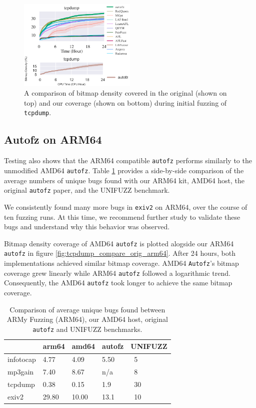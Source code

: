\begin{figure}[ht!]
    \includegraphics[width=0.5\textwidth]{figs/tcpdump_compare_orig_amd64.png}
    \centering
    \caption{A comparison of bitmap density covered in the original\cite{fu_autofz_2023} (shown 
    on top) and our coverage (shown on bottom) during initial fuzzing of \texttt{tcpdump}.}
    \label{fig:tcpdump_compare_orig_amd64}
\end{figure}

\subsection{Autofz on ARM64}

Testing also shows that the ARM64 compatible \texttt{autofz} performs similarly to the unmodified 
AMD64 \texttt{autofz}. Table \ref{arm64-benchmark-comparison} provides a side-by-side comparison 
of the average numbers of unique bugs found with our ARM64 kit, AMD64 host, the original 
\texttt{autofz} paper, and the UNIFUZZ benchmark.

We consistently found many more bugs in \texttt{exiv2} on ARM64, over the course of ten fuzzing 
runs. At this time, we recommend further study to validate these bugs and understand why this 
behavior was observed. 

Bitmap density coverage of AMD64 \texttt{autofz} is plotted alogside our ARM64 \texttt{autofz} in figure 
\ref{fig:tcpdump_compare_orig_arm64}. After 24 hours, both implementations achieved similar bitmap coverage.
AMD64 \texttt{Autofz}'s bitmap coverage grew linearly while ARM64 \texttt{autofz} followed a logarithmic trend. Consequently, 
the AMD64 \texttt{autofz} took longer to achieve the same bitmap coverage. 

\begin{table}[ht!]
    \begin{tabular}{lllll}
        \toprule
         & arm64 & amd64 & autofz & UNIFUZZ \\
        \midrule
        infotocap & 4.77 & 4.09 & 5.50 & ~5 \\
        mp3gain & 7.40 & 8.67 & n/a & ~8 \\
        tcpdump & 0.38 & 0.15 & 1.9 &  ~30 \\
        exiv2 & 29.80 & 10.00 & 13.1 & ~10 \\
        \bottomrule
        \end{tabular}
        \caption{Comparison of average unique bugs found between ARMy Fuzzing (ARM64), our AMD64 
        host, original \texttt{autofz} and UNIFUZZ benchmarks.}
        \label{arm64-benchmark-comparison}
    \end{table}

